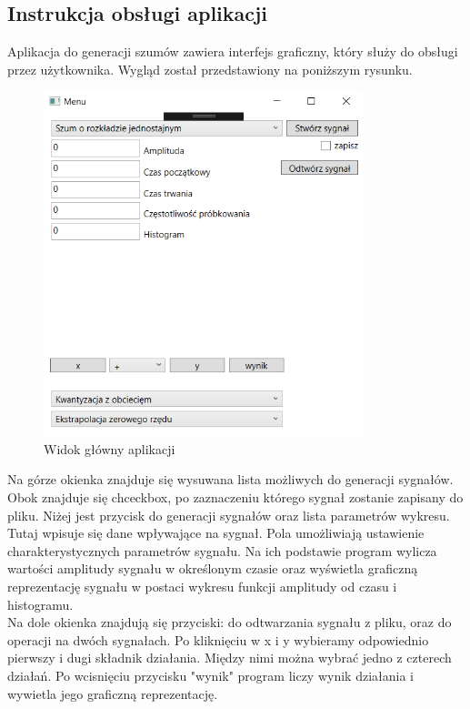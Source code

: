 \documentclass[12pt]{article}
\begin{document}

\subsection{Instrukcja obsługi aplikacji}
Aplikacja do generacji szumów zawiera interfejs graficzny, który służy do obsługi przez użytkownika. Wygląd został przedstawiony na poniższym rysunku.
\newpage
\begin{figure}[h!]
 \centering
 \includegraphics[width=9.3cm]{ui1.PNG}
 \vspace{-0.3cm}
 \caption{Widok główny aplikacji}
 \label{Widok_aplikacjis}
\end{figure}

Na górze okienka znajduje się wysuwana lista możliwych do generacji sygnałów. Obok znajduje się chceckbox, po zaznaczeniu którego sygnał zostanie zapisany do pliku.
Niżej jest przycisk do generacji sygnałów oraz lista parametrów wykresu. Tutaj wpisuje się dane wpływające na sygnał.
Pola umożliwiają ustawienie charakterystycznych parametrów sygnału. Na ich podstawie program wylicza wartości amplitudy sygnału w określonym czasie oraz wyświetla graficzną reprezentację sygnału w postaci wykresu funkcji amplitudy od czasu i histogramu.\\

Na dole okienka znajdują się przyciski: do odtwarzania sygnału z pliku, oraz do operacji na dwóch sygnałach. Po kliknięciu w x i y wybieramy odpowiednio pierwszy i dugi składnik działania. Między nimi można wybrać jedno z czterech działań.  Po wcisnięciu przycisku "wynik" program liczy wynik działania i wywietla jego graficzną reprezentację. 
\end{document}
